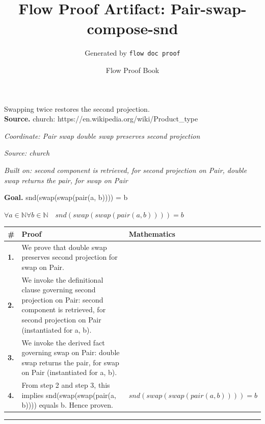 \documentclass[11pt]{article}
\title{Flow Proof Artifact: Pair-swap-compose-snd}
\author{Generated by \texttt{flow doc proof}}
\date{Flow Proof Book}
\theoremstyle{definition}
\begin{document}
\maketitle
Swapping twice restores the second projection.\\[0.5em]
\textbf{Source.} church: https://en.wikipedia.org/wiki/Product\_type\\[0.5em]
\bigskip
{}\par
\smallskip\noindent\textit{Coordinate: Pair \cdot swap \cdot double swap preserves second projection}\par
\smallskip\noindent\textit{Source: church}\par
\smallskip\noindent\textit{Built on: second component is retrieved, for second projection on Pair, double swap returns the pair, for swap on Pair}\par
\medskip
\noindent\textbf{Goal.} snd(swap(swap(pair(a, b)))) = b\par
\noindent$\displaystyle \forall a \in \mathbb{N} \forall b \in \mathbb{N}\quad snd(swap(swap(pair(a, b)))) = b$\par
\medskip
\noindent
\begin{tabular}{@{} >{\raggedright\arraybackslash}p{} >{\raggedright\arraybackslash}p{} >{\raggedleft\arraybackslash}p{} @{}}
\textbf{\#} & \textbf{Proof} & \textbf{Mathematics} \\
\midrule
\textbf{1.} & We prove that double swap preserves second projection for swap on Pair. & \\[0.45em]
\textbf{2.} & We invoke the definitional clause governing second projection on Pair: second component is retrieved, for second projection on Pair (instantiated for a, b). & \\[0.45em]
\textbf{3.} & We invoke the derived fact governing swap on Pair: double swap returns the pair, for swap on Pair (instantiated for a, b). & \\[0.45em]
\textbf{4.} & From step 2 and step 3, this implies snd(swap(swap(pair(a, b)))) equals b. Hence proven. & $\displaystyle snd(swap(swap(pair(a, b)))) = b$ \\[0.45em]
\bottomrule
\end{tabular}
\label{thm:Pair-swap-double_swap_preserves_second_projection}
\par\medskip\hrule
\end{document}
